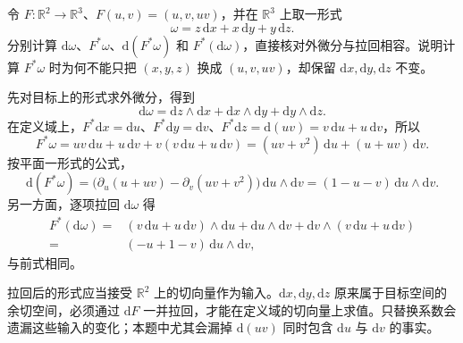\begin{exercise}\label{g1:ex:exterior-pullback-graph}
	令 \(F:\mathbb R^2\to\mathbb R^3\)、\(F(u,v)=(u,v,uv)\)，并在 \(\mathbb R^3\) 上取一形式
	\[
		\omega=z\,\mathrm{d}x+x\,\mathrm{d}y+y\,\mathrm{d}z.
	\]
	分别计算 \(\mathrm{d}\omega\)、\(F^*\omega\)、\(\mathrm{d}(F^*\omega)\) 和 \(F^*(\mathrm{d}\omega)\)，直接核对外微分与拉回相容。说明计算 \(F^*\omega\) 时为何不能只把 \((x,y,z)\) 换成 \((u,v,uv)\)，却保留 \(\mathrm{d}x,\mathrm{d}y,\mathrm{d}z\) 不变。
\end{exercise}
\begin{solution}
	先对目标上的形式求外微分，得到
	\[
		\mathrm{d}\omega=\mathrm{d}z\wedge\mathrm{d}x+\mathrm{d}x\wedge\mathrm{d}y+\mathrm{d}y\wedge\mathrm{d}z.
	\]
	在定义域上，\(F^*\mathrm{d}x=\mathrm{d}u\)、\(F^*\mathrm{d}y=\mathrm{d}v\)、\(F^*\mathrm{d}z=\mathrm{d}(uv)=v\,\mathrm{d}u+u\,\mathrm{d}v\)，所以
	\[
		F^*\omega=uv\,\mathrm{d}u+u\,\mathrm{d}v+v(v\,\mathrm{d}u+u\,\mathrm{d}v)
		=(uv+v^2)\,\mathrm{d}u+(u+uv)\,\mathrm{d}v.
	\]
	按平面一形式的公式，
	\[
		\mathrm{d}(F^*\omega)
		=\bigl(\partial_u(u+uv)-\partial_v(uv+v^2)\bigr)\,\mathrm{d}u\wedge\mathrm{d}v
		=(1-u-v)\,\mathrm{d}u\wedge\mathrm{d}v.
	\]
	另一方面，逐项拉回 \(\mathrm{d}\omega\) 得
	\begin{align*}
		F^*(\mathrm{d}\omega)
		={}&(v\,\mathrm{d}u+u\,\mathrm{d}v)\wedge\mathrm{d}u
		+\mathrm{d}u\wedge\mathrm{d}v
		+\mathrm{d}v\wedge(v\,\mathrm{d}u+u\,\mathrm{d}v)\\
		={}&(-u+1-v)\,\mathrm{d}u\wedge\mathrm{d}v,
	\end{align*}
	与前式相同。

	拉回后的形式应当接受 \(\mathbb R^2\) 上的切向量作为输入。\(\mathrm{d}x,\mathrm{d}y,\mathrm{d}z\) 原来属于目标空间的余切空间，必须通过 \(\mathrm{d}F\) 一并拉回，才能在定义域的切向量上求值。只替换系数会遗漏这些输入的变化；本题中尤其会漏掉 \(\mathrm{d}(uv)\) 同时包含 \(\mathrm{d}u\) 与 \(\mathrm{d}v\) 的事实。
\end{solution}

